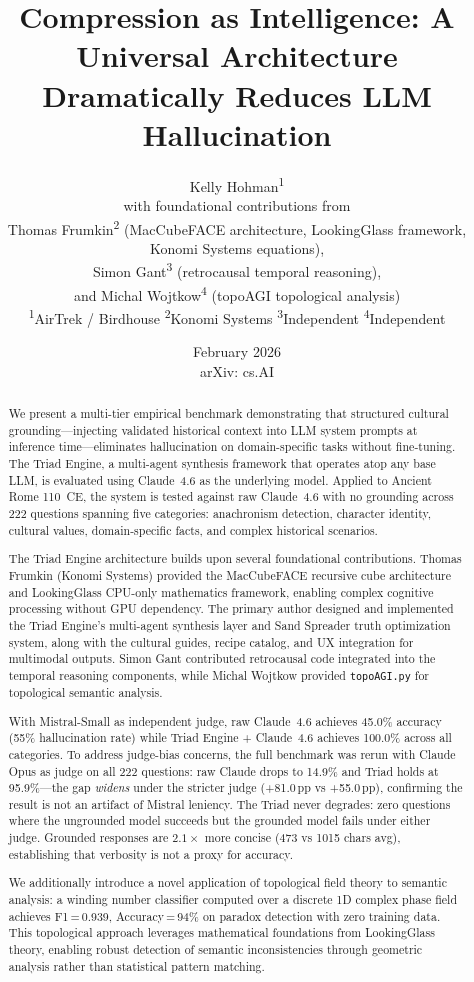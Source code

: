 \documentclass[11pt,a4paper]{article}
\title{\textbf{Compression as Intelligence: A Universal Architecture Dramatically Reduces LLM Hallucination}}
\author{
  Kelly Hohman\textsuperscript{1} \\[0.4em]
  \small with foundational contributions from \\[0.2em]
  \small Thomas Frumkin\textsuperscript{2} (MacCubeFACE architecture, LookingGlass framework, Konomi Systems equations), \\
  \small Simon Gant\textsuperscript{3} (retrocausal temporal reasoning), \\
  \small and Michal Wojtkow\textsuperscript{4} (topoAGI topological analysis) \\[0.8em]
  \small \textsuperscript{1}AirTrek / Birdhouse \quad
  \textsuperscript{2}Konomi Systems \quad
  \textsuperscript{3}Independent \quad
  \textsuperscript{4}Independent
}
\date{February 2026 \\ arXiv: cs.AI}
\begin{document}
\maketitle

\begin{abstract}
We present a multi-tier empirical benchmark demonstrating that structured
cultural grounding---injecting validated historical context into LLM system
prompts at inference time---eliminates hallucination on domain-specific tasks
without fine-tuning. The Triad Engine, a multi-agent synthesis framework that
operates atop any base LLM, is evaluated using Claude~4.6 as the underlying
model. Applied to Ancient Rome 110~CE, the system is tested against raw
Claude~4.6 with no grounding across 222 questions spanning five categories:
anachronism detection, character identity, cultural values, domain-specific
facts, and complex historical scenarios.

The Triad Engine architecture builds upon several foundational contributions.
Thomas Frumkin (Konomi Systems) provided the MacCubeFACE recursive cube
architecture and LookingGlass CPU-only mathematics framework, enabling complex
cognitive processing without GPU dependency. The primary author designed and
implemented the Triad Engine's multi-agent synthesis layer and Sand Spreader
truth optimization system, along with the cultural guides, recipe catalog, and
UX integration for multimodal outputs. Simon Gant contributed retrocausal code
integrated into the temporal reasoning components, while Michal Wojtkow
provided \texttt{topoAGI.py} for topological semantic analysis.

With Mistral-Small as independent judge, raw Claude~4.6 achieves 45.0\%
accuracy (55\% hallucination rate) while Triad Engine + Claude~4.6 achieves
100.0\% across all categories. To address judge-bias concerns, the full
benchmark was rerun with Claude Opus as judge on all 222 questions: raw Claude
drops to 14.9\% and Triad holds at 95.9\%---the gap \emph{widens} under the
stricter judge (+81.0\,pp vs +55.0\,pp), confirming the result is not an
artifact of Mistral leniency. The Triad never degrades: zero questions where
the ungrounded model succeeds but the grounded model fails under either judge.
Grounded responses are $2.1\times$ more concise (473 vs 1015 chars avg),
establishing that verbosity is not a proxy for accuracy.

We additionally introduce a novel application of topological field theory to
semantic analysis: a winding number classifier computed over a discrete 1D
complex phase field achieves F1\,=\,0.939, Accuracy\,=\,94\% on paradox
detection with zero training data. This topological approach leverages
mathematical foundations from LookingGlass theory, enabling robust detection
of semantic inconsistencies through geometric analysis rather than statistical
pattern matching.


\end{abstract}
\end{document}
